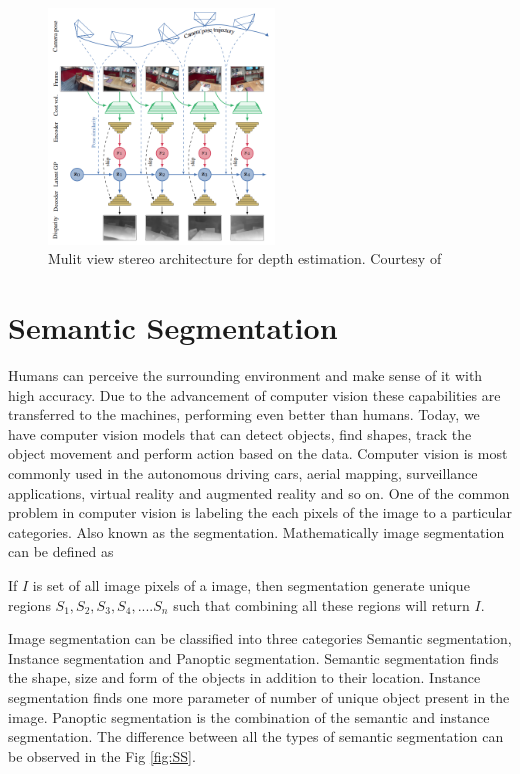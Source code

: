     \begin{figure}
    	\centering
    	\includegraphics[width=6cm]{images/MVS.png}
    	\caption{Mulit view stereo architecture for depth estimation. Courtesy of \cite{52_hou2019multi}}
    	\label{fig:mvs}
    \end{figure} 	

    \section{Semantic Segmentation}
    \label{sec:semseg}
    
    Humans can perceive the surrounding environment and make sense of it with high accuracy. Due to the advancement of computer vision these capabilities are transferred to the machines, performing even better than humans. Today, we have computer vision models that can detect objects, find shapes, track the object movement and perform action based on the data. Computer vision is most commonly used in the autonomous driving cars, aerial mapping, surveillance applications, virtual reality and augmented reality and so on. One of the common problem in computer vision is labeling the each pixels of the image to a particular categories. Also known as the segmentation. Mathematically image segmentation can be defined as
     
    If $I$ is set of all image pixels of a image, then segmentation generate unique regions ${S_1, S_2, S_3, S_4,....S_n}$ such that combining all these regions will return $I$. 
   
    Image segmentation can be classified into three categories Semantic segmentation, Instance segmentation and Panoptic segmentation. Semantic segmentation finds the shape, size and form of the objects in addition to their location. Instance segmentation finds one more parameter of number of unique object present in the image. Panoptic segmentation is the combination of the semantic and instance segmentation. The difference between all the types of semantic segmentation can be observed in the Fig \ref{fig:SS}.
    
